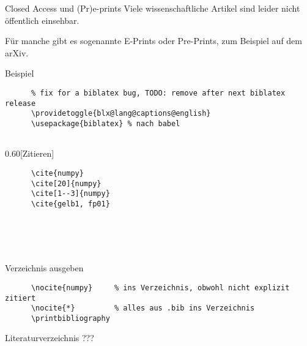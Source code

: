 \begin{frame}[fragile]{Closed Access und (Pr)e-prints}
  Viele wissenschaftliche Artikel sind leider nicht öffentlich einsehbar.

  Für manche gibt es sogenannte E-Prints oder Pre-Prints, zum Beispiel auf dem arXiv.

  \begin{block}{Beispiel}
    \footnotesize
    
  \end{block}

\end{frame}

\begin{frame}[fragile]{%
  \BibLaTeX{}%
  \hfill%
}
  \begin{Packages}
    \begin{lstlisting}
      % fix for a biblatex bug, TODO: remove after next biblatex release
      \providetoggle{blx@lang@captions@english}
      \usepackage{biblatex} % nach babel
      
    \end{lstlisting}
  \end{Packages}
  \begin{CodeExample}{0.60}[Zitieren]
    \begin{lstlisting}
      \cite{numpy}
      \cite[20]{numpy}
      \cite[1--3]{numpy}
      \cite{gelb1, fp01}
    \end{lstlisting}
  \CodeResult
    \cite{numpy} \\
    \cite[20]{numpy} \\
    \cite[1--3]{numpy} \\
    \cite{gelb1, fp01}
  \end{CodeExample}
  \begin{block}{Verzeichnis ausgeben}
    \begin{lstlisting}
      \nocite{numpy}     % ins Verzeichnis, obwohl nicht explizit zitiert
      \nocite{*}         % alles aus .bib ins Verzeichnis
      \printbibliography
    \end{lstlisting}
  \end{block}
\end{frame}

\begin{frame}{Literaturverzeichnis}
  \centering
  \pause
  \Huge ???
\end{frame}

